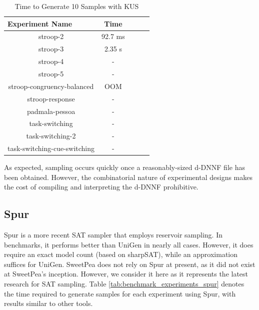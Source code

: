 \begin{table}[b]
  \centering
  \caption{Time to Generate 10 Samples with KUS}
\begin{tabular}{|c|c|c|c|c|}
\hline
\multicolumn{1}{|l|}{Experiment Name} & Time        \\ \hline
stroop-2                              & 92.7 ms     \\ \hline
stroop-3                              & 2.35 s      \\ \hline
stroop-4                              & -           \\ \hline
stroop-5                              & -           \\ \hline
stroop-congruency-balanced            & OOM         \\ \hline  %
stroop-response                       & -           \\ \hline
padmala-pessoa                        & -           \\ \hline
task-switching                        & -           \\ \hline
task-switching-2                      & -           \\ \hline
task-switching-cue-switching          & -           \\ \hline
\end{tabular}
\label{tab:benchmark_experiments_kus}%
\end{table}

As expected, sampling occurs quickly once a reasonably-sized d-DNNF file has been obtained. However, the combinatorial nature of experimental designs makes the cost of compiling and interpreting the d-DNNF prohibitive.


\subsection{Spur}

Spur \cite{spur} is a more recent SAT sampler that employs reservoir sampling. In benchmarks, it performs better than UniGen in nearly all cases. However, it does require an exact model count (based on sharpSAT), while an approximation suffices for UniGen. SweetPea does not rely on Spur at present, as it did not exist at SweetPea's inception. However, we consider it here as it represents the latest research for SAT sampling. Table \ref{tab:benchmark_experiments_spur} denotes the time required to generate samples for each experiment using Spur, with results similar to other tools.

